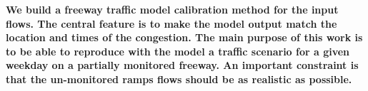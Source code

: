 \textbf{We build a freeway traffic model calibration method for the input flows. The central feature is to make the model output match the location and times of the congestion. The main purpose of this work is to be able to reproduce with the model a traffic scenario for a given weekday on a partially monitored freeway. An important constraint is that the un-monitored ramps flows should be as realistic as possible.}